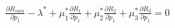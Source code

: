 \documentclass[preview]{standalone}
\begin{document}
\begin{align*}
\frac{\partial {R_{sum}}}{\partial {p_1}} - \lambda^\ast + \mu_1^\ast \frac{\partial {R_1}}{\partial {p_1}} + \mu_2^\ast \frac{\partial {R_2}}{\partial {p_1}} + \mu_3^\ast \frac{\partial {R_3}}{\partial {p_1}} = 0
\end{align*}
\end{document}
